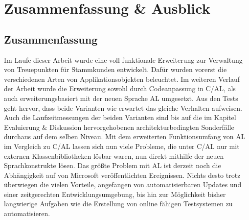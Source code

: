 \chapter{Zusammenfassung \& Ausblick}
\label{cha:Diskussion}

\section{Zusammenfassung}
Im Laufe dieser Arbeit wurde eine voll funktionale Erweiterung zur Verwaltung von Treuepunkten für Stammkunden entwickelt. Dafür wurden vorerst die verschiedenen Arten von Applikationsobjekten beleuchtet. Im weiteren Verlauf der Arbeit wurde die Erweiterung sowohl durch Codeanpassung in C/AL, als auch erweiterungsbasiert mit der neuen Sprache AL umgesetzt. Aus den Tests geht hervor, dass beide Varianten wie erwartet das gleiche Verhalten aufweisen. Auch die Laufzeitmessungen der beiden Varianten sind bis auf die im Kapitel Evaluierung \& Diskussion hervorgehobenen architekturbedingten Sonderfälle durchaus auf dem selben Niveau. Mit dem erweiterten Funktionsumfang von AL im Vergleich zu C/AL lassen sich nun viele Probleme, die unter C/AL nur mit externen Klassenbibliotheken lösbar waren, nun direkt mithilfe der neuen Sprachkonstrukte lösen. Das größte Problem mit AL ist derzeit noch die Abhängigkeit auf von Microsoft veröffentlichten Ereignissen. Nichts desto trotz überwiegen die vielen Vorteile, angefangen von automatisierbaren Updates und einer zeitgerechten Entwicklungsumgebung, bis hin zur Möglichkeit bisher langwierige Aufgaben wie die Erstellung von online fähigen Testsystemen zu automatisieren.

